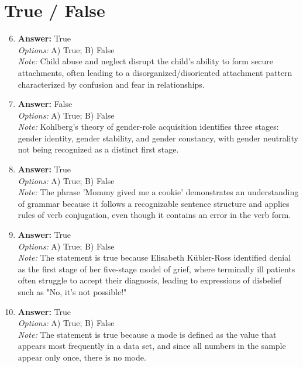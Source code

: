 \documentclass[12pt]{article}
\begin{document}
\section*{True / False}
\begin{enumerate}[label=\arabic*.]
\setcounter{enumi}{5}
\item \textbf{Answer:} True
\\ \textit{Options:} A) True; B) False
\\ \textit{Note:} Child abuse and neglect disrupt the child's ability to form secure attachments, often leading to a disorganized/disoriented attachment pattern characterized by confusion and fear in relationships.
\item \textbf{Answer:} False
\\ \textit{Options:} A) True; B) False
\\ \textit{Note:} Kohlberg's theory of gender-role acquisition identifies three stages: gender identity, gender stability, and gender constancy, with gender neutrality not being recognized as a distinct first stage.
\item \textbf{Answer:} True
\\ \textit{Options:} A) True; B) False
\\ \textit{Note:} The phrase 'Mommy gived me a cookie' demonstrates an understanding of grammar because it follows a recognizable sentence structure and applies rules of verb conjugation, even though it contains an error in the verb form.
\item \textbf{Answer:} True
\\ \textit{Options:} A) True; B) False
\\ \textit{Note:} The statement is true because Elisabeth Kübler-Ross identified denial as the first stage of her five-stage model of grief, where terminally ill patients often struggle to accept their diagnosis, leading to expressions of disbelief such as "No, it's not possible!"
\item \textbf{Answer:} True
\\ \textit{Options:} A) True; B) False
\\ \textit{Note:} The statement is true because a mode is defined as the value that appears most frequently in a data set, and since all numbers in the sample appear only once, there is no mode.
\end{enumerate}
\end{document}
